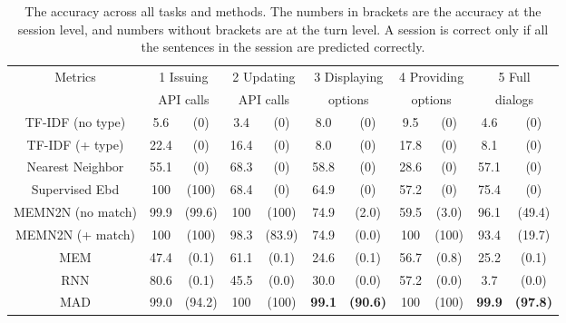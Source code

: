 \begin{table*}
\centering
\begin{tabular}{c | c c | c c | c c | c c | c c }
    \hline
        \multirow{2}{*}{Metrics} & \multicolumn{2}{c|}{1 Issuing } & \multicolumn{2}{c|}{2 Updating} & \multicolumn{2}{c|}{3 Displaying} & \multicolumn{2}{c|}{4 Providing} & \multicolumn{2}{c}{5 Full} \\ 
        & \multicolumn{2}{c|}{API calls} & \multicolumn{2}{c|}{API calls} & \multicolumn{2}{c|}{options} & \multicolumn{2}{c|}{options} & \multicolumn{2}{c}{dialogs} \\
    \hline
        {TF-IDF (no type)} & 5.6 & (0) & 3.4 & (0) & 8.0 & (0) & 9.5 & (0) & 4.6 & (0)\\
        {TF-IDF (+ type)} & 22.4 & (0) & 16.4 & (0) & 8.0 & (0) & 17.8 & (0) & 8.1 & (0)\\
        {Nearest Neighbor} & 55.1 & (0) & 68.3 & (0) & 58.8 & (0) & 28.6 & (0) & 57.1 & (0)\\
        {Supervised Ebd} & 100 & (100) & 68.4 & (0) & 64.9 & (0) & 57.2 & (0) & 75.4 & (0)\\
        {MEMN2N (no match)} & 99.9 & (99.6) & 100 & (100) & 74.9 & (2.0) & 59.5 & (3.0) & 96.1 & (49.4)\\
        {MEMN2N (+ match)} & 100 & (100) & 98.3 & (83.9) & 74.9 & (0.0) & 100 & (100) & 93.4 & (19.7)\\
    \hline
        {MEM} & 47.4 & (0.1) & 61.1 & (0.1) & 24.6 & (0.1) & 56.7 & (0.8) & 25.2 & (0.1) \\
        {RNN} & 80.6 & (0.1) & 45.5 & (0.0) & 30.0 & (0.0) & 57.2 & (0.0) & 3.7 & (0.0) \\
    \hline
        {MAD} & 99.0 & (94.2) & 100 & (100) & {\bf 99.1} & {\bf (90.6)} & 100 & (100) & {\bf 99.9} & {\bf (97.8)}\\
    \hline
\end{tabular}
\caption{\label{tab:result} The accuracy across all tasks and methods. The numbers in brackets are the accuracy at the session level, and numbers without brackets are at the turn level. A session is correct only if all the sentences in the session are predicted correctly.}
\end{table*}


